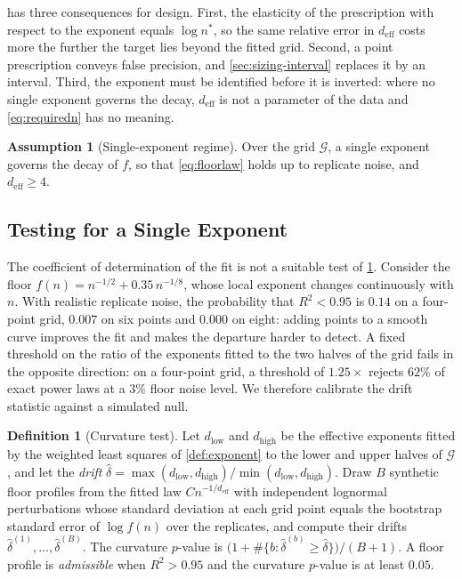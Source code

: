 \documentclass[twoside,11pt]{article}
\theoremstyle{plain}
\theoremstyle{definition}
\newtheorem{defn}{Definition}
\newtheorem{assumption}{Assumption}
\theoremstyle{remark}
\newcommand{\deff}{\ensuremath{d_{\mathrm{eff}}}}
\begin{document}
 has three consequences for design. First, the
elasticity of the prescription with respect to the exponent equals
$\log n^{*}$, so the same relative error in $\deff$ costs more the further
the target lies beyond the fitted grid. Second, a point prescription
conveys false precision, and \cref{sec:sizing-interval} replaces it by an
interval. Third, the exponent must be identified before it is inverted:
where no single exponent governs the decay, $\deff$ is not a parameter of
the data and \cref{eq:requiredn} has no meaning.

\begin{assumption}[Single-exponent regime]\label{ass:single}
Over the grid $\mathcal{G}$, a single exponent governs the decay of $f$,
so that \cref{eq:floorlaw} holds up to replicate noise, and $\deff \geq 4$.
\end{assumption}

\subsection{Testing for a Single Exponent}\label{sec:sizing-spec}

The coefficient of determination of the fit is not a suitable test of
\cref{ass:single}. Consider the floor $f(n) = n^{-1/2} + 0.35\, n^{-1/8}$,
whose local exponent changes continuously with $n$. With realistic replicate noise,
the probability that $R^2 < 0.95$ is $0.14$ on a four-point grid, $0.007$ on
six points and $0.000$ on eight: adding points to a smooth curve improves
the fit and makes the departure harder to detect. A fixed threshold on the
ratio of the exponents fitted to the two halves of the grid fails in the
opposite direction: on a four-point grid, a threshold of $1.25\times$
rejects $62\%$ of exact power laws at a $3\%$ floor noise level. We therefore calibrate the drift
statistic against a simulated null.

\begin{defn}[Curvature test]\label{def:curvature}
Let $d_{\mathrm{low}}$ and $d_{\mathrm{high}}$ be the effective exponents
fitted by the weighted least squares of \cref{def:exponent} to the lower
and upper halves of $\mathcal{G}$, and let the \emph{drift}
$\hat\delta = \max(d_{\mathrm{low}}, d_{\mathrm{high}}) /
\min(d_{\mathrm{low}}, d_{\mathrm{high}})$. Draw $B$ synthetic floor
profiles from the fitted law $C n^{-1/\deff}$ with independent lognormal
perturbations whose standard deviation at each grid point equals the
bootstrap standard error of $\log f(n)$ over the replicates, and compute
their drifts $\hat\delta^{(1)}, \dots, \hat\delta^{(B)}$. The curvature
$p$-value is $\bigl(1 + \#\{b : \hat\delta^{(b)} \geq \hat\delta\}\bigr)/(B+1)$.
A floor profile is \emph{admissible} when $R^2 > 0.95$ and the curvature
$p$-value is at least $0.05$.
\end{defn}
\end{document}
